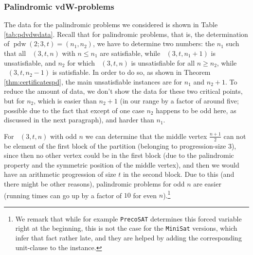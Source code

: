 \documentclass[final,3p,times]{elsarticle}
\theoremstyle{definition}
\newcommand{\minisat}{\texttt{MiniSat}}
\newcommand{\precosat}{\texttt{PrecoSAT}}
\DeclareMathOperator{\vdwpd}{pdw}
\DeclareMathOperator{\Fpd}{\mathit{F}^{pd}}
\begin{document}
\subsubsection{Palindromic vdW-problems}
\label{sec:remsatcomppdvdw}

The data for the palindromic problems we considered is shown in Table \ref{tab:pdvdwdata}. Recall that for palindromic problems, that is, the determination of $\vdwpd(2;3,t) = (n_1,n_2)$, we have to determine two numbers: the $n_1$ such that all $\Fpd(3,t,n)$ with $n \le n_1$ are satisfiable, while $\Fpd(3,t,n_1+1)$ is unsatisfiable, and $n_2$ for which $\Fpd(3,t,n)$ is unsatisfiable for all $n \ge n_2$, while $\Fpd(3,t,n_2-1)$ is satisfiable. In order to do so, as shown in Theorem \ref{thm:certificatespd}, the main unsatisfiable instances are for $n_1$ and $n_2+1$. To reduce the amount of data, we don't show the data for these two critical points, but for $n_2$, which is easier than $n_2+1$ (in our range by a factor of around five; possible due to the fact that except of one case $n_2$ happens to be odd here, as discussed in the next paragraph), and harder than $n_1$.

For $\Fpd(3,t,n)$ with odd $n$ we can determine that the middle vertex $\frac{n+1}2$ can not be element of the first block of the partition (belonging to progression-size $3$), since then no other vertex could be in the first block (due to the palindromic property and the symmetric position of the middle vertex), and then we would have an arithmetic progression of size $t$ in the second block. Due to this (and there might be other reasons), palindromic problems for odd $n$ are easier (running times can go up by a factor of $10$ for even $n$).\footnote{We remark that while for example \precosat{} determines this forced variable right at the beginning, this is not the case for the \minisat{} versions, which infer that fact rather late, and they are helped by adding the corresponding unit-clause to the instance.}
\end{document}
